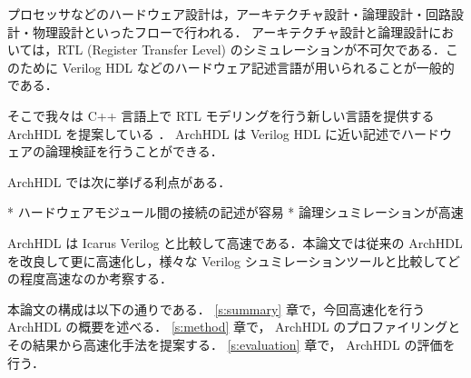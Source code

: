 プロセッサなどのハードウェア設計は，アーキテクチャ設計・論理設計・回路設計・物理設計といったフローで行われる．
アーキテクチャ設計と論理設計においては，RTL (Register Transfer Level)
のシミュレーションが不可欠である．このために
Verilog HDL などのハードウェア記述言語が用いられることが一般的である．

そこで我々は C++ 言語上で RTL モデリングを行う新しい言語を提供する ArchHDL を提案している \cite{satos:archhdl}．
ArchHDL は Verilog HDL に近い記述でハードウェアの論理検証を行うことができる．

ArchHDL では次に挙げる利点がある．

* ハードウェアモジュール間の接続の記述が容易
* 論理シュミレーションが高速

ArchHDL は Icarus Verilog と比較して高速である．本論文では従来の
ArchHDL を改良して更に高速化し，様々な Verilog シュミレーションツールと比較してどの程度高速なのか考察する．


本論文の構成は以下の通りである． \ref{s:summary} 章で，今回高速化を行う ArchHDL の概要を述べる．
\ref{s:method} 章で， ArchHDL のプロファイリングとその結果から高速化手法を提案する．
\ref{s:evaluation} 章で， ArchHDL の評価を行う．


